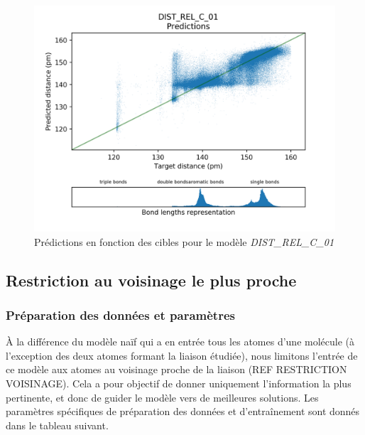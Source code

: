 \begin{figure}[!h]
	\centering
	
	\includegraphics[scale=0.7]{../figures/DIST_REL_C_01/DIST_REL_C_01_preds_targets.png}	
	
	\caption{Prédictions en fonction des cibles pour le modèle \emph{DIST\_REL\_C\_01}}
	
\end{figure}

\subsection{Restriction au voisinage le plus proche}

\subsubsection{Préparation des données et paramètres}
À la différence du modèle naïf qui a en entrée tous les atomes d'une molécule (à l'exception des deux atomes formant la liaison étudiée), nous limitons l'entrée de ce modèle aux atomes au voisinage proche de la liaison (REF RESTRICTION VOISINAGE). Cela a pour objectif de donner uniquement l'information la plus pertinente, et donc de guider le modèle vers de meilleures solutions. Les paramètres spécifiques de préparation des données et d'entraînement sont donnés dans le tableau suivant.

